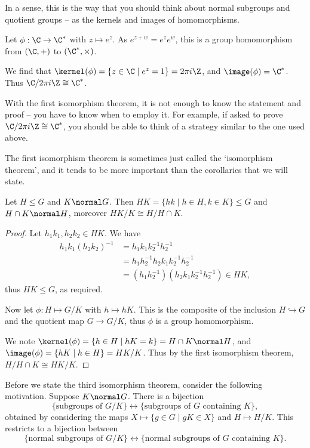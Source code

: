 In a sense, this is the way that you should think about normal subgroups and quotient groups -- as the kernels and images of homomorphisms.

\begin{example}
	Let $\phi : \C \rightarrow \C^{*}$ with $z \mapsto e^z$. As $e^{z + w} = e^z e^w$, this is a group homomorphism from $(\C, +)$ to $(\C^*, \times)$. 

	We find that $\kernel(\phi) = \{ z \in \C \mid e^z = 1 \} = 2 \pi i \Z$, and $\image(\phi) = \C^*$. Thus $\C/2 \pi i \Z \cong \C^*$.
\end{example}

With the first isomorphism theorem, it is not enough to know the statement and proof -- you have to know when to employ it. For example, if asked to prove $\C/2 \pi i \Z \cong \C^*$, you should be able to think of a strategy similar to the one used above.

The first isomorphism theorem is sometimes just called the `isomorphism theorem', and it tends to be more important than the corollaries that we will state.

\begin{corollary}
	Let $H \leq G$ and $K \normal G$. Then $HK = \{hk \mid h \in H, k \in K \} \leq G$ and $H \cap K \normal H$, moreover $HK/K \cong H/H \cap K$.
\end{corollary}
\begin{proof}
	Let $h_1 k_1, h_2 k_2 \in HK$. We have
	\begin{align*}
		h_1 k_1 (h_2 k_2)^{-1} &= h_1 k_1 k_2^{-1} h_2^{-1} \\&= h_1 h_2^{-1} h_2 k_1 k_2^{-1} h_2^{-1} \\&= (h_1 h_2^{-1}) (h_2 k_1 k_2^{-1} h_2^{-1}) \in HK,
	\end{align*}
	thus $HK \leq G$, as required.

	Now let $\phi:H \mapsto G/K$ with $h \mapsto hK$. This is the composite of the inclusion $H \hookrightarrow G$ and the quotient map $G \rightarrow G/K$, thus $\phi$ is a group homomorphism.

	We note $\kernel(\phi) = \{h \in H \mid hK = k\} = H \cap K \normal H$, and $\image(\phi) =\{hK \mid h \in H \} = HK / K$. Thus by the first isomorphism theorem,
	$
	H/H \cap K \cong HK/K.
	$
\end{proof}

Before we state the third isomorphism theorem, consider the following motivation. Suppose $K \normal G$. There is a bijection
$$
\{\text{subgroups of } G/K \} \longleftrightarrow \{ \text{subgroups of } G \text{ containing }K \},
$$
obtained by considering the maps $X \mapsto \{g \in G \mid gK \in X \}$ and $H \mapsto H/K$. This restricts to a bijection between
$$
\{\text{normal subgroups of }G/K \} \longleftrightarrow \{\text{normal subgroups of }G\text{ containing }K\}.
$$

